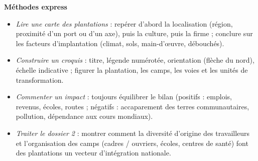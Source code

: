 \documentclass[11pt]{article}
\newcommand{\cle}[1]{{\popxbold\color{popdark}#1}}
\begin{document}
\begin{bilan}
\textbf{Méthodes express}
\begin{itemize}
  \item \emph{Lire une carte des plantations} : repérer d'abord la localisation (région, proximité d'un port ou d'un axe), puis la culture, puis la firme ; conclure sur les facteurs d'implantation (climat, sols, main-d'œuvre, débouchés).
  \item \emph{Construire un croquis} : titre, légende numérotée, orientation (flèche du nord), échelle indicative ; figurer la plantation, les camps, les voies et les unités de transformation.
  \item \emph{Commenter un impact} : toujours équilibrer le bilan (positifs : emplois, revenus, écoles, routes ; négatifs : accaparement des terres communautaires, pollution, dépendance aux cours mondiaux).
  \item \emph{Traiter le dossier 2} : montrer comment la diversité d'origine des travailleurs et l'organisation des camps (cadres / ouvriers, écoles, centres de santé) font des plantations un vecteur d'\cle{intégration nationale}.
\end{itemize}
\end{bilan}
\end{document}
